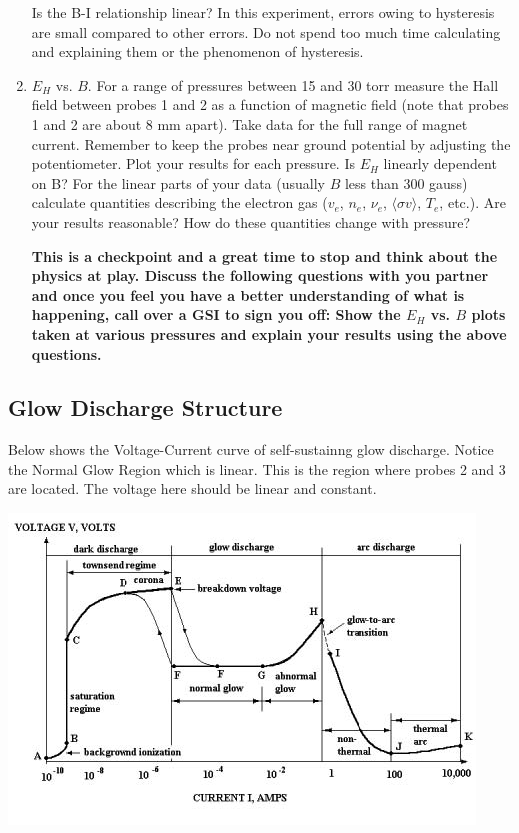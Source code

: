 \documentclass{../lab}
\begin{document}
\begin{enumerate}
    Is the B-I relationship linear? In this experiment, errors owing to hysteresis are small compared to other errors. Do not spend too much time calculating and explaining them or the phenomenon of hysteresis.

    \item $E_H$ vs. $B$. For a range of pressures between 15 and 30 torr measure the Hall field between probes 1 and 2 as a function of magnetic field (note that probes 1 and 2 are about 8 mm apart). Take data for the full range of magnet current. Remember to keep the probes near ground potential by adjusting the potentiometer. Plot your results for each pressure. Is $E_H$ linearly dependent on B? For the linear parts of your data (usually $B$ less than 300 gauss) calculate quantities describing the electron gas ($v_e$, $n_e$, $\nu_e$, $\langle \sigma v \rangle$, $T_e$, etc.). Are your results reasonable? How do these quantities change with pressure?

\textbf{This is a checkpoint and a great time to stop and think about the physics at play. Discuss the following questions with you partner and once you feel you have a better understanding of what is happening, call over a GSI to sign you off:
Show the $E_H$ vs. $B$ plots taken at various pressures and explain your results using the above questions.}

\end{enumerate}

\subsection{Glow Discharge Structure}

Below shows the Voltage-Current curve of self-sustainng glow discharge. Notice the Normal Glow Region which is linear. This is the region where probes 2 and 3 are located. The voltage here should be linear and constant.

\begin{center}
    \href{http://experimentationlab.berkeley.edu/sites/default/files/images/DischargeStructure.jpg}{\includegraphics[width=0.8\linewidth]{images/DischargeStructure.jpg}}
\end{center}
\end{document}
